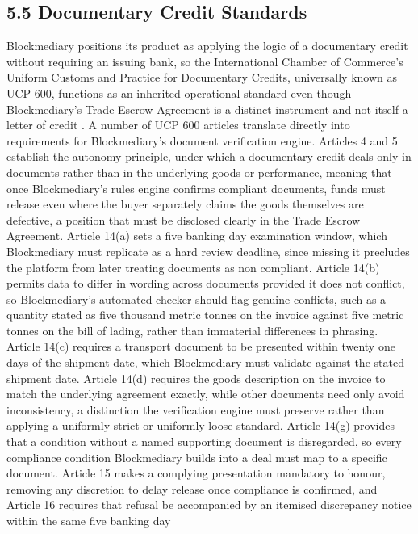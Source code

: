 \documentclass[12pt, a4paper]{article}
\begin{document}
\subsection*{5.5 Documentary Credit Standards}

Blockmediary positions its product as applying the logic of a documentary credit without
requiring an issuing bank, so the International Chamber of Commerce's Uniform Customs and
Practice for Documentary Credits, universally known as UCP 600, functions as an inherited
operational standard even though Blockmediary's Trade Escrow Agreement is a distinct
instrument and not itself a letter of credit \citep{ucp600}. A number of UCP 600 articles
translate directly into requirements for Blockmediary's document verification engine.
Articles 4 and 5 establish the autonomy principle, under which a documentary credit deals
only in documents rather than in the underlying goods or performance, meaning that once
Blockmediary's rules engine confirms compliant documents, funds must release even where
the buyer separately claims the goods themselves are defective, a position that must be
disclosed clearly in the Trade Escrow Agreement. Article 14(a) sets a five banking day
examination window, which Blockmediary must replicate as a hard review deadline, since
missing it precludes the platform from later treating documents as non compliant. Article
14(b) permits data to differ in wording across documents provided it does not conflict,
so Blockmediary's automated checker should flag genuine conflicts, such as a quantity
stated as five thousand metric tonnes on the invoice against five metric tonnes on the
bill of lading, rather than immaterial differences in phrasing. Article 14(c) requires a
transport document to be presented within twenty one days of the shipment date, which
Blockmediary must validate against the stated shipment date. Article 14(d) requires the
goods description on the invoice to match the underlying agreement exactly, while other
documents need only avoid inconsistency, a distinction the verification engine must
preserve rather than applying a uniformly strict or uniformly loose standard. Article
14(g) provides that a condition without a named supporting document is disregarded, so
every compliance condition Blockmediary builds into a deal must map to a specific
document. Article 15 makes a complying presentation mandatory to honour, removing any
discretion to delay release once compliance is confirmed, and Article 16 requires that
refusal be accompanied by an itemised discrepancy notice within the same five banking day
\end{document}
